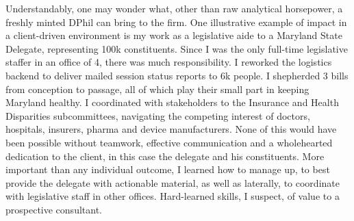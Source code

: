 \documentclass[a4paper]{../res}
\begin{document}
\begin{sloppypar}
\begin{resume}


Understandably, one may wonder what, other than raw analytical horsepower, a freshly minted DPhil can bring to the firm. One illustrative example of impact in a client-driven environment is my work as a legislative aide to a Maryland State Delegate, representing 100k constituents. Since I was the only full-time legislative staffer in an office of 4, there was much responsibility. I reworked the logistics backend to deliver mailed session status reports to 6k people. I shepherded 3 bills from conception to passage, all of which play their small part in keeping Maryland healthy. I coordinated with stakeholders to the Insurance and Health Disparities subcommittees, navigating the competing interest of doctors, hospitals, insurers, pharma and device manufacturers. None of this would have been possible without teamwork, effective communication and a wholehearted dedication to the client, in this case the delegate and his constituents. More important than any individual outcome, I learned how to manage up, to best provide the delegate with actionable material, as well as laterally, to coordinate with legislative staff in other offices. Hard-learned skills, I suspect, of value to a prospective consultant.


\end{resume}
\end{sloppypar}
\end{document}
